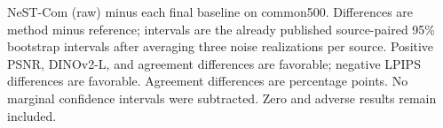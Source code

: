NeST-Com (raw) minus each final baseline on common500. Differences are method minus reference; intervals are the already published source-paired 95\% bootstrap intervals after averaging three noise realizations per source. Positive PSNR, DINOv2-L, and agreement differences are favorable; negative LPIPS differences are favorable. Agreement differences are percentage points. No marginal confidence intervals were subtracted. Zero and adverse results remain included.
